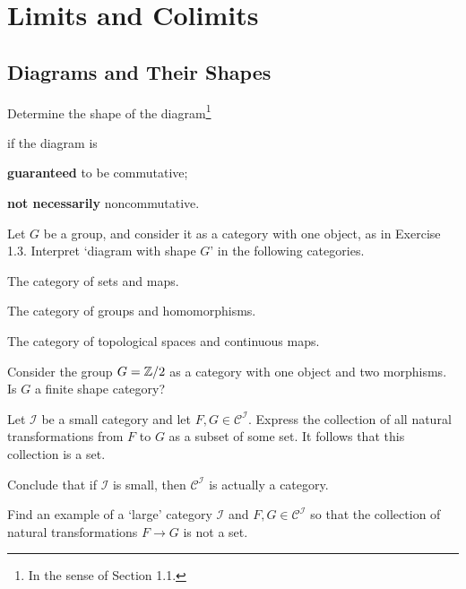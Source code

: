 \chapter{Limits and Colimits}

\section{Diagrams and Their Shapes}

\bx
Determine the shape of the diagram\footnote{In the sense of Section 1.1.}
\bse
{}
\ese
if the diagram is
\ben[label=(\alph*)]
\item \textbf{guaranteed} to be commutative;
\item \textbf{not necessarily} noncommutative.
\een 
\ex

\bs
\ben[label=(\alph*)]
\item  
\item 
\een
\es

\bx
Let $G$ be a group, and consider it as a category with one object, as in Exercise 1.3. Interpret `diagram with shape $G$' in the following categories.
\ben[label=(\alph*)]
\item  The category of sets and maps.
\item The category of groups and homomorphisms.
\item The category of topological spaces and continuous maps.
\een
\ex

\bs
\ben[label=(\alph*)]
\item  
\item
\item 
\een
\es

\bx
Consider the group $G = \mathbb{Z}/2$ as a category with one object and two morphisms. Is $G$ a finite shape category?
\ex

\bs
\es

\bx
\ben[label=(\alph*)]
\item Let $\mathcal{I}$ be a small category and let $F,G \in \mathcal{C}^{\mathcal{I}}$. Express the collection of all natural transformations from $F$ to $G$ as a subset of some set. It follows that this collection is a set.
\item Conclude that if $\mathcal{I}$ is small, then $\mathcal{C}^{\mathcal{I}}$ is actually a category.
\item Find an example of a `large' category $\mathcal{I}$ and $F,G \in \mathcal{C}^{\mathcal{I}}$ so that the collection of natural transformations $F \to G$ is not a set.
\een
\ex

